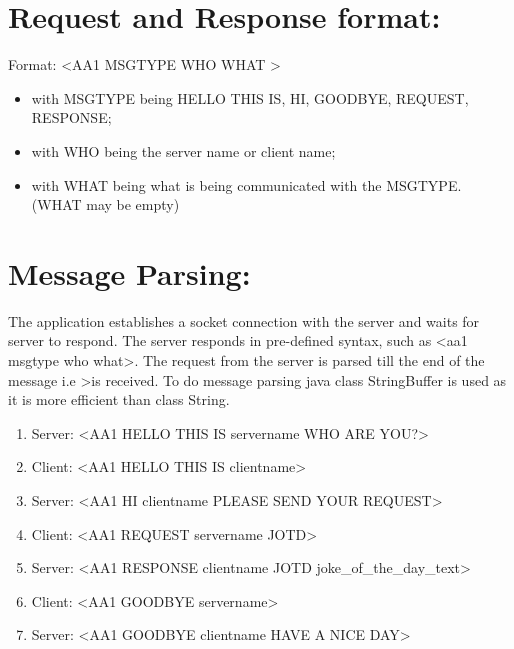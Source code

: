 \documentclass[11pt]{report}
\begin{document}
\section*{Request and Response format:}
Format: \textless AA1 MSGTYPE WHO WHAT \textgreater
\begin{itemize}
\item with MSGTYPE being HELLO THIS IS, HI, GOODBYE, REQUEST, RESPONSE;
\item with WHO being the server name or client name;
\item with WHAT being what is being communicated with the MSGTYPE. (WHAT may be empty)
\end{itemize}

\section*{Message Parsing:}
The application establishes a socket connection with the server and waits for server to respond. The server responds in pre-defined syntax, such as \textless aa1 msgtype who what\textgreater. The request from the server is parsed till the end of the message i.e \textgreater is received. To do message parsing java class StringBuffer is used as it is more efficient than class String.
\begin{enumerate}
\item Server: \textless AA1 HELLO THIS IS servername WHO ARE YOU?\textgreater
\item Client: \textless AA1 HELLO THIS IS clientname\textgreater
\item Server: \textless AA1 HI clientname PLEASE SEND YOUR REQUEST\textgreater
\item Client: \textless AA1 REQUEST servername JOTD\textgreater
\item Server: \textless AA1 RESPONSE clientname JOTD joke\_of\_the\_day\_text\textgreater
\item Client: \textless AA1 GOODBYE servername\textgreater
\item Server: \textless AA1 GOODBYE clientname HAVE A NICE DAY\textgreater
\end{enumerate}	
\end{document}
